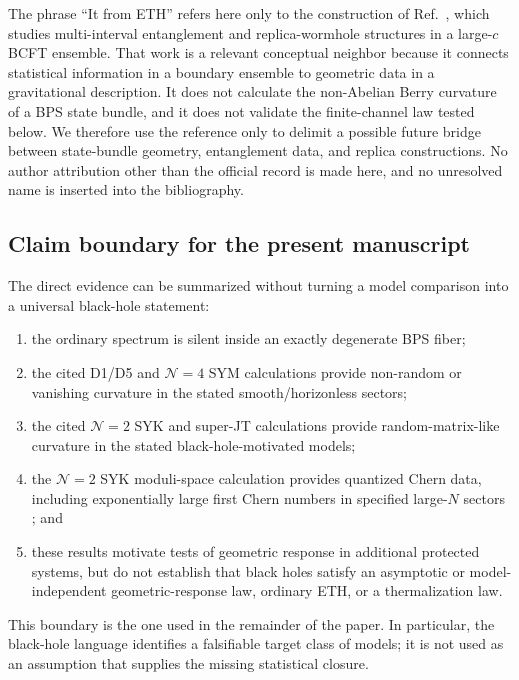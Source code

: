 The phrase ``It from ETH'' refers here only to the construction of
Ref.~\cite{itfrometh2025}, which studies multi-interval entanglement and
replica-wormhole structures in a large-$c$ BCFT ensemble.  That work is a
relevant conceptual neighbor because it connects statistical information in a
boundary ensemble to geometric data in a gravitational description.  It does
not calculate the non-Abelian Berry curvature of a BPS state bundle, and it
does not validate the finite-channel law tested below.  We therefore use the
reference only to delimit a possible future bridge between state-bundle
geometry, entanglement data, and replica constructions.  No author attribution
other than the official record is made here, and no unresolved name is inserted
into the bibliography.

\subsection{Claim boundary for the present manuscript}

The direct evidence can be summarized without turning a model comparison into
a universal black-hole statement:
\begin{enumerate}
  \item the ordinary spectrum is silent inside an exactly degenerate BPS
  fiber;
  \item the cited D1/D5 and $\mathcal{N}=4$ SYM calculations provide
  non-random or vanishing curvature in the stated smooth/horizonless sectors;
  \item the cited $\mathcal{N}=2$ SYK and super-JT calculations provide
  random-matrix-like curvature in the stated black-hole-motivated models;
  \item the $\mathcal{N}=2$ SYK moduli-space calculation provides quantized
  Chern data, including exponentially large first Chern numbers in specified
  large-$N$ sectors \cite{chen2026berry}; and
  \item these results motivate tests of geometric response in additional
  protected systems, but do not establish that black holes satisfy an
  asymptotic or model-independent geometric-response law, ordinary ETH, or a
  thermalization law.
\end{enumerate}

This boundary is the one used in the remainder of the paper.  In particular,
the black-hole language identifies a falsifiable target class of models; it is
not used as an assumption that supplies the missing statistical closure.
